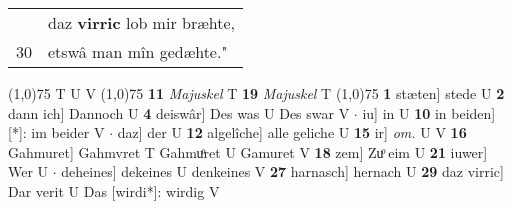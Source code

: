 \documentclass[8pt,a4paper,notitlepage]{article}
\begin{document}
\begin{table}[ht]
\begin{minipage}[t]{0.5\linewidth}
\begin{tabular}{rl}
 & daz \textbf{virric} lob mir bræhte,\\ 
30 & etswâ man mîn gedæhte."\\ 
\end{tabular}
\scriptsize
\line(1,0){75} \newline
T U V \newline
\line(1,0){75} \newline
\textbf{11} \textit{Majuskel} T  \textbf{19} \textit{Majuskel} T  \newline
\line(1,0){75} \newline
\textbf{1} stæten] stede U \textbf{2} dann ich] Dannoch U \textbf{4} deiswâr] Des was U Des swar V  $\cdot$ iu] in U \textbf{10} in beiden] [*]: im beider V  $\cdot$ daz] der U \textbf{12} algelîche] alle geliche U \textbf{15} ir] \textit{om.} U V \textbf{16} Gahmuret] Gahmvret T Gahmuͦret U Gamuret V \textbf{18} zem] Zuͦ eim U \textbf{21} iuwer] Wer U  $\cdot$ deheines] dekeines U denkeines V \textbf{27} harnasch] hernach U \textbf{29} daz virric] Dar verit U Das [wirdi*]: wirdig V \newline
\end{minipage}
\end{table}
\end{document}
